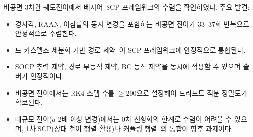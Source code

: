\documentclass[11pt]{article}
\begin{document}
비공면 3차원 궤도전이에서 베지어--SCP 프레임워크의 수렴을 확인하였다.
주요 발견:
\begin{itemize}
  \item 경사각, RAAN, 이심률의 동시 변경을 포함하는 비공면 전이가
        33--37회 반복으로 안정적으로 수렴한다.
  \item 드 카스텔조 세분화 기반 경로 제약~\cite{report013}이
        SCP 프레임워크에 안정적으로 통합된다.
  \item SOCP 추력 제약, 경로 부등식 제약, BC 등식 제약을
        동시에 적용할 수 있으며 솔버가 안정적이다.
  \item 비공면 전이에서는 RK4 스텝 수를 $\ge 200$으로 설정해야
        드리프트 적분 정밀도가 확보된다.
  \item 대규모 전이($a$ 2배 이상 변경)에서는
        0차 선형화의 한계로 수렴이 어려울 수 있으며,
        1차 SCP(상태 천이 행렬 활용)나 커플링 행렬~\cite{report012}의
        통합이 향후 과제이다.
\end{itemize}



\end{document}
